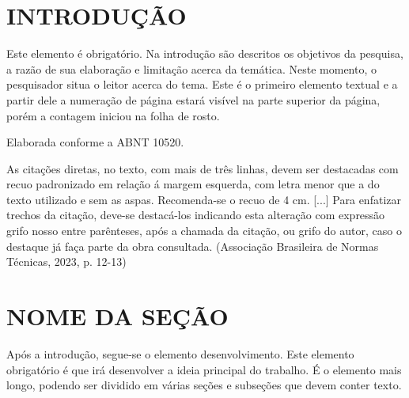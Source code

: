 \documentclass[
        oneside,      %
        english,			
        brazil			 
        ]{abntbibufjf}
\begin{document}

\textual


\chapter{INTRODU\c{C}\~AO}  %

Este elemento \'e obrigat\'orio. Na introdu\c{c}\~ao s\~ao descritos os objetivos da pesquisa, a raz\~ao de sua elabora\c{c}\~ao e limita\c{c}\~ao acerca da 
tem\'atica. Neste momento, o pesquisador situa o leitor acerca do tema. Este \'e o primeiro elemento textual e a partir dele a numera\c{c}\~ao de p\'agina 
estar\'a vis\'ivel na parte superior da p\'agina, por\'em a contagem iniciou na folha de rosto. 

Elaborada conforme a ABNT 10520.

\begin{citacao}
As cita\c{c}\~oes diretas, no texto, com mais de tr\^es linhas, devem ser destacadas
com recuo padronizado em rela\c{c}\~ao \'a margem esquerda, com letra menor que a do texto utilizado
e sem as aspas. Recomenda-se o recuo de 4 cm. [...] Para enfatizar trechos da cita\c{c}\~ao, deve-se destac\'a-los indicando esta
altera\c{c}\~ao com express\~ao grifo nosso entre par\^enteses, ap\'os a chamada da cita\c{c}\~ao, ou grifo 
do autor, caso o destaque j\'a fa\c{c}a parte da obra consultada. (Associa\c{c}\~ao Brasileira de Normas
T\'ecnicas, 2023, p. 12-13)
\end{citacao}



\chapter{NOME DA SE\c{C}\~{A}O} %

Ap\'os a introdu\c{c}\~ao, segue-se o elemento desenvolvimento. Este elemento obrigat\'orio \'e que ir\'a desenvolver a ideia principal do trabalho. 
\'E o elemento mais longo, podendo ser dividido em v\'arias se\c{c}\~oes %
e subse\c{c}\~oes que devem conter texto. 
\end{document}
